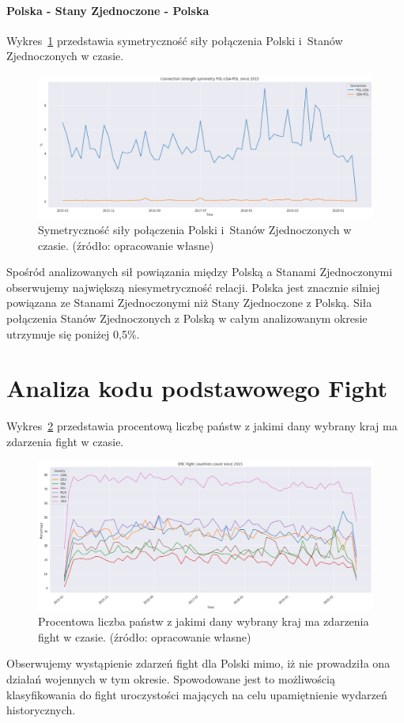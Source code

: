 \documentclass[11pt]{report}
\begin{document}
    \paragraph{Polska - Stany Zjednoczone - Polska}

    Wykres~\ref{fig:POL-USA-POL} przedstawia symetryczność siły połączenia Polski i~Stanów Zjednoczonych w czasie.
    \begin{figure}[!htp]
        \centering
        \includegraphics[width=\linewidth]{fig/ConnectionSymmetry/POL-USA-POL.png}
        \caption{Symetryczność siły połączenia Polski i~Stanów Zjednoczonych w czasie. (źródło: opracowanie własne)}
        \label{fig:POL-USA-POL}
    \end{figure}
    Spośród analizowanych sił powiązania między Polską a Stanami Zjednoczonymi obserwujemy największą niesymetryczność relacji.
    Polska jest znacznie silniej powiązana ze Stanami Zjednoczonymi niż Stany Zjednoczone z Polską.
    Siła połączenia Stanów Zjednoczonych z Polską w całym analizowanym okresie utrzymuje się poniżej 0,5\%.


    \section{Analiza kodu podstawowego Fight}\label{sec:analiza-kodu-podstawowego-fight}

    Wykres~\ref{fig:Fight} przedstawia procentową liczbę państw z jakimi dany wybrany kraj ma zdarzenia fight w czasie.
    \begin{figure}[!htp]
        \centering
        \includegraphics[width=\linewidth]{fig/ERC/Fight.png}
        \caption{Procentowa liczba państw z jakimi dany wybrany kraj ma zdarzenia fight w czasie. (źródło: opracowanie własne)}
        \label{fig:Fight}
    \end{figure}
    Obserwujemy wystąpienie zdarzeń fight dla Polski mimo, iż nie prowadziła ona działań wojennych w tym okresie.
    Spowodowane jest to możliwością klasyfikowania do fight uroczystości mających na celu upamiętnienie wydarzeń historycznych.
\end{document}
